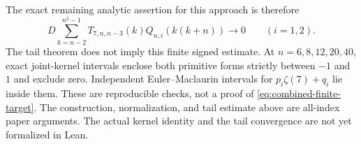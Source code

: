\documentclass[11pt]{article}
\theoremstyle{remark}
\begin{document}
The exact remaining analytic assertion for this approach is therefore
\begin{equation}
 D\sum_{k=n-2}^{n^2-1}
       T_{7,n,n-3}(k)Q_{n,i}(k(k+n))\longrightarrow0
       \qquad(i=1,2).
 \label{eq:combined-finite-target}
\end{equation}
The tail theorem does not imply this finite signed estimate. At
\(n=6,8,12,20,40\), exact joint-kernel intervals enclose both primitive
forms strictly between \(-1\) and \(1\) and exclude zero. Independent
Euler--Maclaurin intervals for \(p_i\zeta(7)+q_i\) lie inside them.
These are reproducible checks, not a proof of
\eqref{eq:combined-finite-target}. The construction, normalization,
and tail estimate above are all-index paper arguments. The actual
kernel identity and the tail convergence are not yet formalized in Lean.
\end{document}
